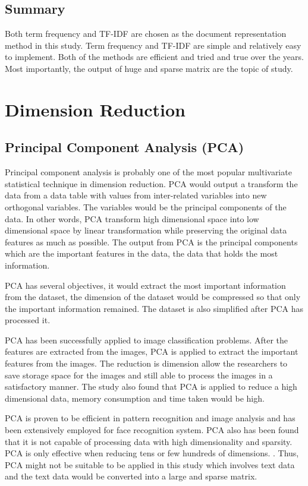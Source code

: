 \subsection{Summary}
Both term frequency and TF-IDF are chosen as the document representation method in this study. Term frequency and TF-IDF are simple and relatively easy to implement. Both of the methods are efficient and tried and true over the years. Most importantly, the output of huge and sparse matrix are the topic of study.\\

\clearpage
\section{Dimension Reduction}
\subsection{Principal Component Analysis (PCA)}
Principal component analysis is probably one of the most popular multivariate statistical technique in dimension reduction. PCA would output a transform the data from a data table with values from inter-related variables into new orthogonal variables. The variables would be the principal components of the data. In other words, PCA transform high dimensional space into low dimensional space by linear transformation while preserving the original data features as much as possible. \cite{pcaImage} The output from PCA is the principal components which are the important features in the data, the data that holds the most information.

PCA has several objectives, it would extract the most important information from the dataset, the dimension of the dataset would be compressed so that only the important information remained. The dataset is also simplified after PCA has processed it. \cite{pcaObj}

PCA has been successfully applied to image classification problems. After the features are extracted from the images, PCA is applied to extract the important features from the images. The reduction is dimension allow the researchers to save storage space for the images and still able to process the images in a satisfactory manner. The study also found that PCA is applied to reduce a high dimensional data, memory consumption and time taken would be high. \cite{pcaImage}

PCA is proven to be efficient in pattern recognition and image analysis and has been extensively employed for face recognition system. PCA also has been found that it is not capable of processing data with high dimensionality and sparsity. PCA is only effective when reducing tens or few hundreds of dimensions. \cite{dimRedCat}. Thus, PCA might not be suitable to be applied in this study which involves text data and the text data would be converted into a large and sparse matrix.\\


